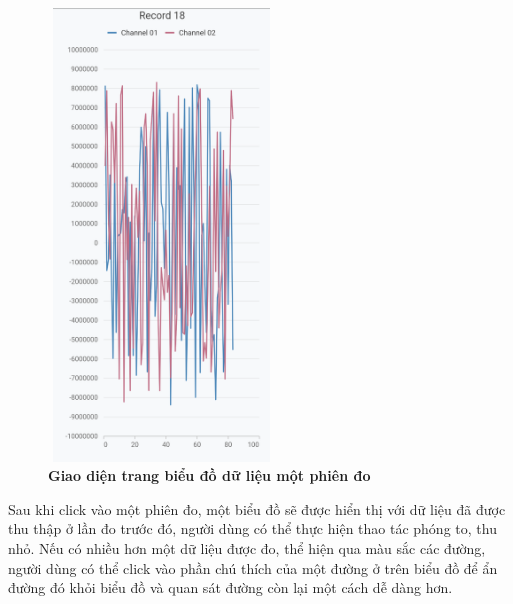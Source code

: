 \begin{figure}[H]
  \centering
  \includegraphics[width=6cm,height=12cm]{Images/mobile_app/demo/detail_record.png}
  \caption[Giao diện trang biểu đồ dữ liệu một phiên đo]{\bfseries \fontsize{12pt}{0pt}\selectfont Giao diện trang biểu đồ dữ liệu một phiên đo}
  \label{demo_detail_record}
\end{figure}

Sau khi click vào một phiên đo, một biểu đồ sẽ được hiển thị với dữ liệu đã được thu thập ở lần đo trước đó, người dùng có thể
thực hiện thao tác phóng to, thu nhỏ. Nếu có nhiều hơn một dữ liệu được đo, thể hiện qua màu sắc các đường, người dùng có thể
click vào phần chú thích của một đường ở trên biểu đồ để ẩn đường đó khỏi biểu đồ và quan sát đường còn lại một cách dễ dàng hơn.

